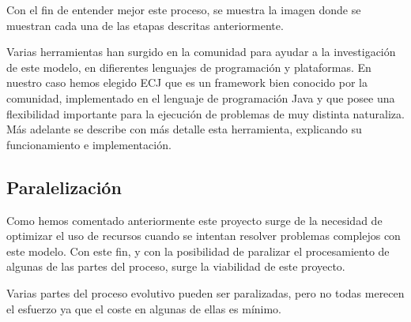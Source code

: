 Con el fin de entender mejor este proceso, se muestra la imagen  donde se muestran cada una de las etapas descritas anteriormente.


Varias herramientas han surgido en la comunidad para ayudar a la investigación de este modelo, en difierentes lenguajes de programación y plataformas. En nuestro caso hemos elegido ECJ que es un framework bien conocido por la comunidad, implementado en el lenguaje de programación Java y que posee una flexibilidad importante para la ejecución de problemas de muy distinta naturaliza. M\'as adelante  se describe con m\'as detalle esta herramienta, explicando su funcionamiento e implementación.

\subsection{Paralelizaci\'on}

Como hemos comentado anteriormente  este proyecto surge de la necesidad de optimizar el uso de recursos cuando se intentan resolver problemas complejos con este modelo. Con este fin, y con la posibilidad de paralizar el procesamiento de algunas de las partes del proceso, surge la viabilidad de este proyecto.

Varias partes del proceso evolutivo pueden ser paralizadas, pero no todas merecen el esfuerzo ya que el coste en algunas de ellas es mínimo. 




